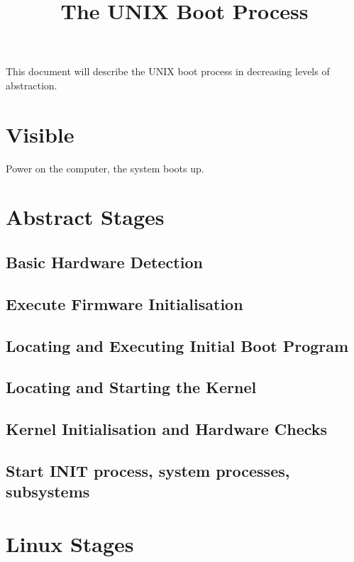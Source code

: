 \documentclass[]{article}
\title{The UNIX Boot Process}
\begin{document}
\large

\maketitle

This document will describe the UNIX boot process in decreasing levels of abstraction.

\newpage
\section{Visible}

Power on the computer, the system boots up.

\newpage
\section{Abstract Stages}

    \subsection{Basic Hardware Detection}

    \subsection{Execute Firmware Initialisation}

    \subsection{Locating and Executing Initial Boot Program}

    \subsection{Locating and Starting the Kernel}

    \subsection{Kernel Initialisation and Hardware Checks}

    \subsection{Start INIT process, system processes, subsystems}

\newpage
\section{Linux Stages}
\end{document}
